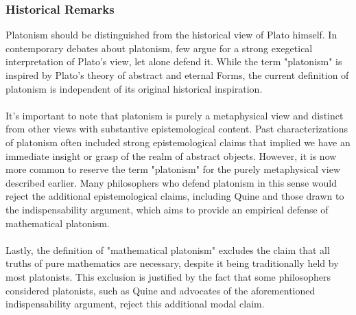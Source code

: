 \documentclass[10pt,a4paper]{article}
\newcounter{theo}
\begin{document}
                    \subsubsection{Historical Remarks}
                        Platonism should be distinguished from the historical view of Plato himself. In contemporary debates about platonism, few argue for a strong exegetical interpretation of Plato's view, let alone defend it. While the term "platonism" is inspired by Plato's theory of abstract and eternal Forms, the current definition of platonism is independent of its original historical inspiration.
                        \\
                        \\
                        It's important to note that platonism is purely a metaphysical view and distinct from other views with substantive epistemological content. Past characterizations of platonism often included strong epistemological claims that implied we have an immediate insight or grasp of the realm of abstract objects. However, it is now more common to reserve the term "platonism" for the purely metaphysical view described earlier. Many philosophers who defend platonism in this sense would reject the additional epistemological claims, including Quine and those drawn to the indispensability argument, which aims to provide an empirical defense of mathematical platonism.
                        \\
                        \\
                        Lastly, the definition of "mathematical platonism" excludes the claim that all truths of pure mathematics are necessary, despite it being traditionally held by most platonists. This exclusion is justified by the fact that some philosophers considered platonists, such as Quine and advocates of the aforementioned indispensability argument, reject this additional modal claim.
\end{document}

